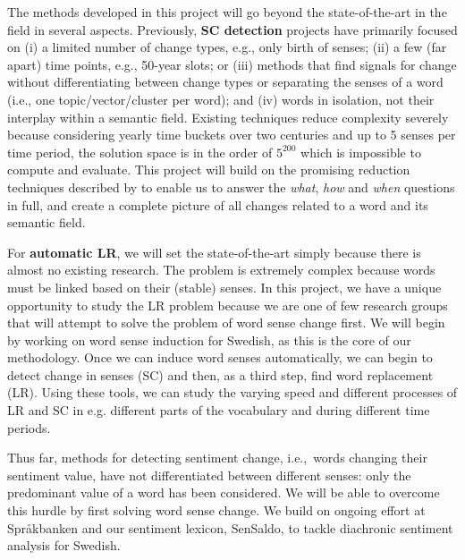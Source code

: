 \documentclass[12pt,twoside,a4paper]{article}
\newcommand\ie{{i.e.,\ }}
\begin{document}
   \vspace{0.1cm} 
    The methods developed in this project will go beyond the state-of-the-art in the field in several aspects. Previously, \textbf{SC detection} projects have primarily focused on (i) a limited number of change types, e.g., only birth of senses; (ii) a few (far apart) time points, e.g., 50-year slots; or (iii) methods that find signals for change without differentiating between change types or separating the senses of a word (i.e., one topic/vector/cluster per word); and (iv) words in isolation, not their interplay within a semantic field. 
    Existing techniques reduce complexity severely because considering yearly time buckets over two centuries and up to 5 senses per time period, the solution space is in the order of $5^{200}$ which is impossible to compute and evaluate. This project will build on the promising reduction techniques described by \cite{Tahmasebi-RANLP2017} to enable us to answer the \textit{what}, \textit{how} and \textit{when} questions in full, and create a complete picture of all changes related to a word and its semantic field. 
    
    \vspace{0.1cm}   
	For  \textbf{automatic LR}, we will set the state-of-the-art simply because there is almost no existing research. The problem is extremely complex because words must be linked based on their (stable) senses. In this project, we have a unique opportunity to study the LR problem because we are one of few research groups that will attempt to solve the problem of word sense change first. We will begin by working on word sense induction for Swedish, as this is the core of our methodology. Once we can induce word senses automatically, we can begin to detect change in senses (SC) and then, as a third step, find word replacement (LR). Using these tools, we can study the varying speed and different processes of LR and SC in e.g. different parts of the vocabulary and during different time periods.
% 

Thus far, methods for detecting sentiment change, \ie words changing their sentiment value, \citep{COOK, sentimentDynamics} have not differentiated between different senses: only the predominant value of a word has been considered.  We will be able to overcome this hurdle by first solving word sense change.	We build on ongoing effort at Språkbanken and our sentiment lexicon, SenSaldo, to tackle diachronic sentiment analysis for Swedish.  
\end{document}
